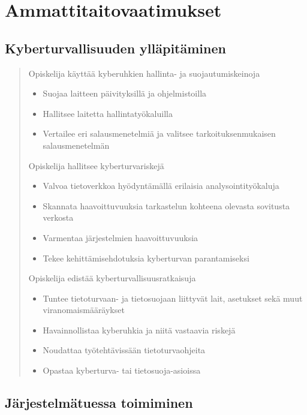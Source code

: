 \documentclass[../wifi-security.tex]{subfiles}
\begin{document}
\section{Ammattitaitovaatimukset}

\subsection{Kyberturvallisuuden ylläpitäminen}

\begin{quote}
Opiskelija käyttää kyberuhkien hallinta- ja suojautumiskeinoja
\begin{itemize}
\item Suojaa laitteen päivityksillä ja ohjelmistoilla
\item Hallitsee laitetta hallintatyökaluilla
\item Vertailee eri salausmenetelmiä ja valitsee tarkoituksenmukaisen salausmenetelmän
\end{itemize}
Opiskelija hallitsee kyberturvariskejä
\begin{itemize}
\item Valvoa tietoverkkoa hyödyntämällä erilaisia analysointityökaluja
\item Skannata haavoittuvuuksia tarkastelun kohteena olevasta sovitusta verkosta
\item Varmentaa järjestelmien haavoittuvuuksia
\item Tekee kehittämisehdotuksia kyberturvan parantamiseksi
\end{itemize}
Opiskelija edistää kyberturvallisuusratkaisuja
\begin{itemize}
\item Tuntee tietoturvaan- ja tietosuojaan liittyvät lait, asetukset sekä muut viranomaismääräykset
\item Havainnollistaa kyberuhkia ja niitä vastaavia riskejä
\item Noudattaa työtehtävissään tietoturvaohjeita
\item Opastaa kyberturva- tai tietosuoja-asioissa
\end{itemize}
\end{quote}

\subsection{Järjestelmätuessa toimiminen}
\end{document}
